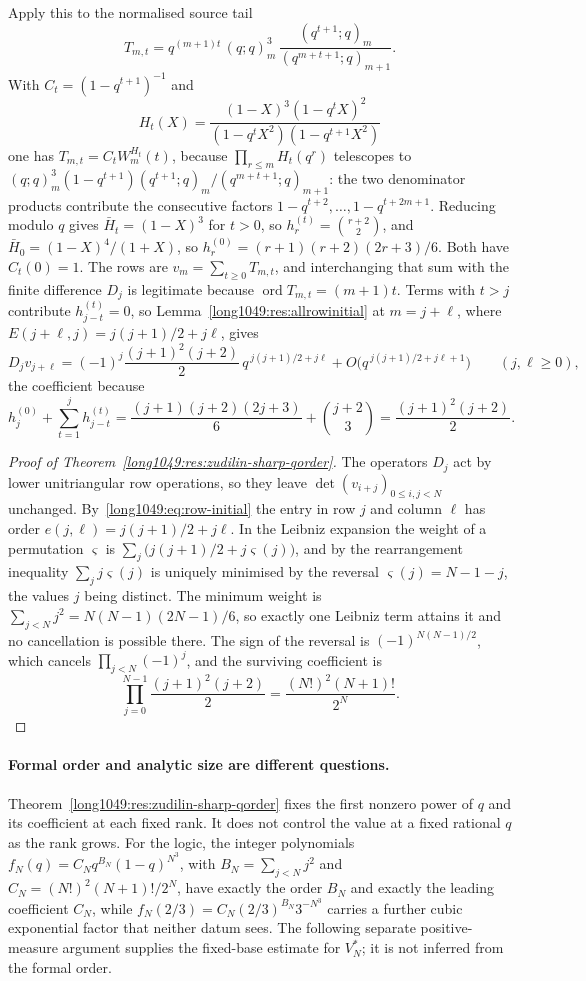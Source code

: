 \noindent Apply this to the normalised source tail
\[
 T_{m,t}=q^{(m+1)t}\,(q;q)_m^{3}\,\frac{(q^{t+1};q)_m}{(q^{m+t+1};q)_{m+1}} .
\]
With $C_t=(1-q^{t+1})^{-1}$ and
\[
 H_t(X)=\frac{(1-X)^{3}(1-q^{t}X)^{2}}{(1-q^{t}X^{2})(1-q^{t+1}X^{2})}
\]
one has $T_{m,t}=C_tW_m^{H_t}(t)$, because
$\prod_{r\le m}H_t(q^{r})$ telescopes to
$(q;q)_m^{3}(1-q^{t+1})(q^{t+1};q)_m/(q^{m+t+1};q)_{m+1}$: the two denominator
products contribute the consecutive factors $1-q^{t+2},\dots,1-q^{t+2m+1}$.
Reducing modulo $q$ gives $\bar H_t=(1-X)^{3}$ for $t>0$, so
$h^{(t)}_r=\binom{r+2}{2}$, and $\bar H_0=(1-X)^{4}/(1+X)$, so
$h^{(0)}_r=(r+1)(r+2)(2r+3)/6$.  Both have $C_t(0)=1$.  The rows are
$v_m=\sum_{t\ge0}T_{m,t}$, and interchanging that sum with the finite
difference $D_j$ is legitimate because $\operatorname{ord}T_{m,t}=(m+1)t$.  Terms
with $t>j$ contribute $h^{(t)}_{j-t}=0$, so Lemma~\ref{long1049:res:allrowinitial} at
$m=j+\ell$, where $E(j+\ell,j)=j(j+1)/2+j\ell$, gives
\begin{equation}\label{long1049:eq:row-initial}
 D_jv_{j+\ell}=(-1)^{j}\frac{(j+1)^{2}(j+2)}2\,q^{\,j(j+1)/2+j\ell}
 +O\bigl(q^{\,j(j+1)/2+j\ell+1}\bigr)
 \qquad(j,\ell\ge0),
\end{equation}
the coefficient because
\[
 h^{(0)}_j+\sum_{t=1}^{j}h^{(t)}_{j-t}
 =\frac{(j+1)(j+2)(2j+3)}6+\binom{j+2}3
 =\frac{(j+1)^{2}(j+2)}2 .
\]

\begin{proof}[Proof of Theorem~\ref{long1049:res:zudilin-sharp-qorder}]
The operators $D_j$ act by lower unitriangular row operations, so they leave
$\det(v_{i+j})_{0\le i,j<N}$ unchanged.  By~\eqref{long1049:eq:row-initial} the entry in
row $j$ and column $\ell$ has order $e(j,\ell)=j(j+1)/2+j\ell$.  In the Leibniz
expansion the weight of a permutation $\varsigma$ is
$\sum_j\bigl(j(j+1)/2+j\varsigma(j)\bigr)$, and by the rearrangement inequality
$\sum_jj\varsigma(j)$ is uniquely minimised by the reversal
$\varsigma(j)=N-1-j$, the values $j$ being distinct.  The minimum weight is
$\sum_{j<N}j^{2}=N(N-1)(2N-1)/6$, so exactly one Leibniz term attains it and no
cancellation is possible there.  The sign of the reversal is
$(-1)^{N(N-1)/2}$, which cancels $\prod_{j<N}(-1)^{j}$, and the surviving
coefficient is
\[
 \prod_{j=0}^{N-1}\frac{(j+1)^{2}(j+2)}2=\frac{(N!)^{2}(N+1)!}{2^{N}} .
\]
\end{proof}

\paragraph{Formal order and analytic size are different questions.}
Theorem~\ref{long1049:res:zudilin-sharp-qorder} fixes the first nonzero power of $q$ and
its coefficient at each fixed rank.  It does not control the value at a fixed
rational $q$ as the rank grows.  For the logic, the integer polynomials
$f_N(q)=C_Nq^{B_N}(1-q)^{N^{3}}$, with $B_N=\sum_{j<N}j^{2}$ and
$C_N=(N!)^{2}(N+1)!/2^{N}$, have exactly the order $B_N$ and exactly the leading
coefficient $C_N$, while $f_N(2/3)=C_N(2/3)^{B_N}3^{-N^{3}}$ carries a further
cubic exponential factor that neither datum sees.  The following separate
positive-measure argument supplies the fixed-base estimate for $V_N^*$;
it is not inferred from the formal order.

